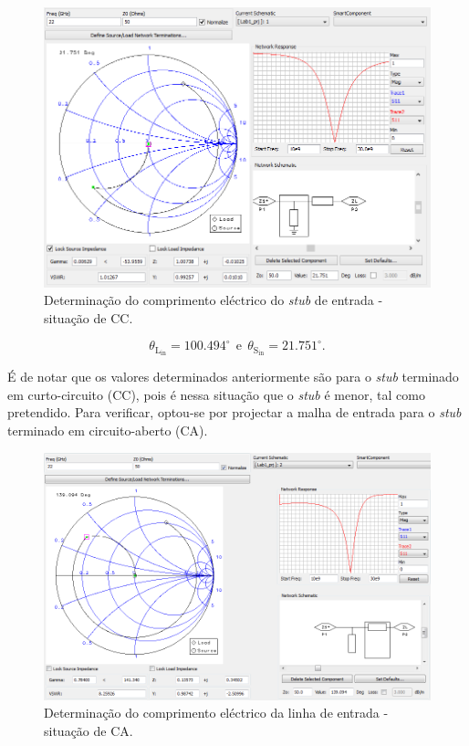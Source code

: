 \documentclass[11pt]{article}
\numberwithin{equation}{section}
\begin{document}
\begin{figure}[H]
	\centering
	\includegraphics[keepaspectratio=true, scale=0.45]{exps/Gerador_cc_stub}
	\vspace{-0.5em}
	\caption{Determinação do comprimento eléctrico do \textit{stub} de entrada - situação de CC.}
	\vspace{-0.8em}
\end{figure}

\vspace{-3mm}
\begin{equation}
	\theta_{\text{L}_{\text{in}}} = 100.494^{\circ}  ~~ \text{e} ~~ \theta_{\text{S}_{\text{in}}} = 21.751^{\circ}.
\end{equation}

\vspace{1mm} 
É de notar que os valores determinados anteriormente são para o \textit{stub} terminado em curto-circuito (CC), pois é nessa situação que o \textit{stub} é menor, tal como pretendido. Para verificar, optou-se por projectar a malha de entrada para o \textit{stub} terminado em circuito-aberto (CA).

\begin{figure}[H]
	\centering
	\includegraphics[keepaspectratio=true, scale=0.45]{exps/Gerador_Ca_line}
	\vspace{-0.5em}
	\caption{Determinação do comprimento eléctrico da linha de entrada - situação de CA.}
	\vspace{-0.8em}
\end{figure}
\end{document}
